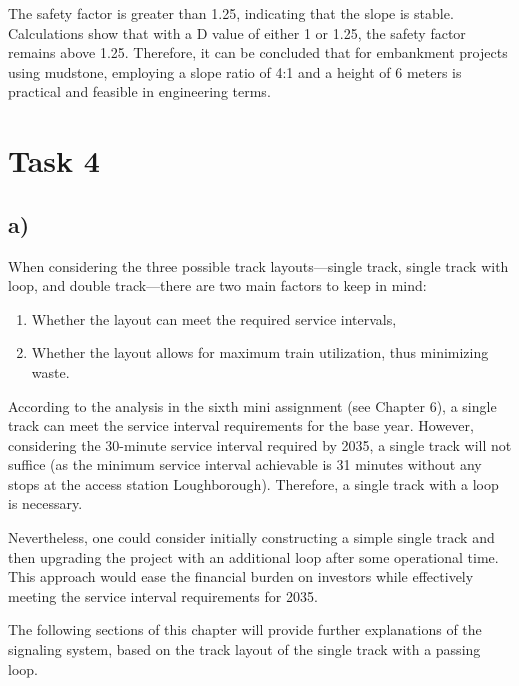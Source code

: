 \documentclass[letterpaper,12pt,leqno]{article}
\begin{document}
	
	The safety factor is greater than 1.25, indicating that the slope is
	stable. Calculations show that with a D value of either 1 or 1.25, the
	safety factor remains above 1.25. Therefore, it can be concluded that
	for embankment projects using mudstone, employing a slope ratio of 4:1
	and a height of 6 meters is practical and feasible in engineering terms.

\section{Task 4}

\subsection{a)}

When considering the three possible track layouts—single track, single track with loop, and double track—there are two main factors to keep in mind:

\begin{enumerate}
    \item Whether the layout can meet the required service intervals,
    \item Whether the layout allows for maximum train utilization, thus minimizing waste.
\end{enumerate}

According to the analysis in the sixth mini assignment (see Chapter 6), a single track can meet the service interval requirements for the base year. However, considering the 30-minute service interval required by 2035, a single track will not suffice (as the minimum service interval achievable is 31 minutes without any stops at the access station Loughborough). Therefore, a single track with a loop is necessary. 

Nevertheless, one could consider initially constructing a simple single track and then upgrading the project with an additional loop after some operational time. This approach would ease the financial burden on investors while effectively meeting the service interval requirements for 2035.

The following sections of this chapter will provide further explanations of the signaling system, based on the track layout of the single track with a passing loop.
\end{document}

